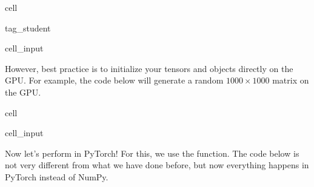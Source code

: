 \documentclass[letterpaper,10pt,english]{jupyterBook}
\begin{document}
\begin{sphinxuseclass}{cell}
\begin{sphinxuseclass}{tag_student}\begin{sphinxVerbatimInput}

\begin{sphinxuseclass}{cell_input}
\begin{sphinxVerbatim}[commandchars=\\\{\}]
\end{sphinxVerbatim}

\end{sphinxuseclass}\end{sphinxVerbatimInput}

\end{sphinxuseclass}
\end{sphinxuseclass}
\sphinxAtStartPar
However, best practice is to initialize your tensors and objects directly on the GPU. For example, the code below will generate a random \(1000\times 1000\) matrix on the GPU.

\begin{sphinxuseclass}{cell}\begin{sphinxVerbatimInput}

\begin{sphinxuseclass}{cell_input}
\begin{sphinxVerbatim}[commandchars=\\\{\}]
    
\end{sphinxVerbatim}

\end{sphinxuseclass}\end{sphinxVerbatimInput}

\end{sphinxuseclass}
\sphinxAtStartPar
Now let’s perform  in PyTorch! For this, we use the  function. The code below is not very different from what we have done before, but now everything happens in PyTorch instead of NumPy.
\end{document}

